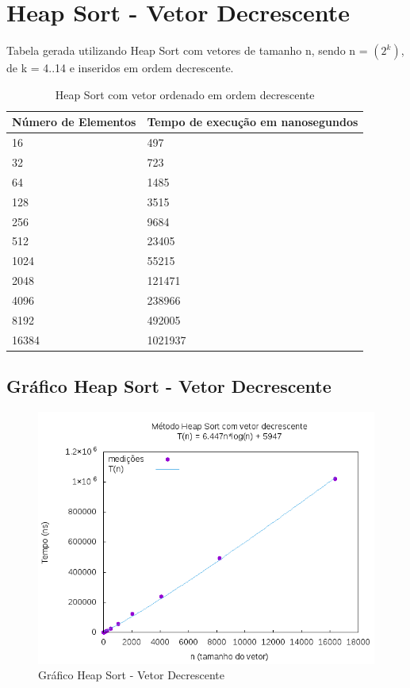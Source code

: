 \documentclass[12pt,a4paper,twoside]{report}
\begin{document}
\section{Heap Sort - Vetor Decrescente}
Tabela gerada utilizando Heap Sort com vetores de tamanho n, sendo n = $(2^k)$, de k = 4..14 e inseridos em ordem decrescente.
\begin{table}[H]
\centering
\caption{Heap Sort com vetor ordenado em ordem decrescente}
\label{my-label}
\begin{tabular}{|l|l|}
\hline
\multicolumn{1}{|c|}{\textbf{Número de Elementos}} & \multicolumn{1}{c|}{\textbf{Tempo de execução em nanosegundos}} \\ \hline
16 & 497 \\ \hline
32 & 723 \\ \hline
64 & 1485 \\ \hline
128 & 3515 \\ \hline
256 & 9684 \\ \hline
512 & 23405 \\ \hline
1024 & 55215 \\ \hline
2048 & 121471 \\ \hline
4096 & 238966 \\ \hline
8192 & 492005 \\ \hline
16384 & 1021937 \\ \hline
\end{tabular}
\end{table}

\subsection{Gráfico Heap Sort - Vetor Decrescente}
\begin{figure}[H]
    \centering
    \includegraphics[width=0.7\linewidth]{graficos/HeapSort/vIntDecrescente/vIntDecrescente.png}
  \caption{Gráfico Heap Sort - Vetor Decrescente}
\end{figure}
\end{document}
